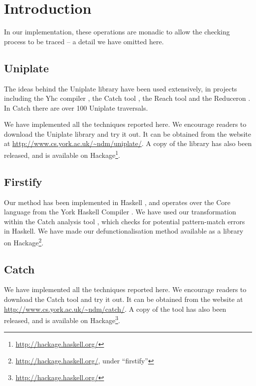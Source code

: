 
\chapter{Introduction}



\cite{haskell}

In our implementation, these operations are monadic to allow the checking process to be traced -- a detail we have omitted here.

\section{Uniplate}

The ideas behind the Uniplate library have been used extensively, in projects including the Yhc compiler \citep{me:yhc_core}, the Catch tool \citep{me:catch_tfp}, the Reach tool \cite{naylor:reach} and the Reduceron \cite{naylor:reduceron}. In Catch there are over 100 Uniplate traversals.

We have implemented all the techniques reported here. We encourage readers to download the Uniplate library and try it out. It can be obtained from the website at \url{http://www.cs.york.ac.uk/~ndm/uniplate/}. A copy of the library has also been released, and is available on Hackage\footnote{\url{http://hackage.haskell.org/}}.

\section{Firstify}

Our method has been implemented in Haskell \cite{haskell}, and operates over the Core language from the York Haskell Compiler \cite{me:yhc_core}. We have used our transformation within the Catch analysis tool \cite{me:catch_icfp}, which checks for potential pattern-match errors in Haskell. We have made our defunctionalisation method available as a library on Hackage\footnote{\url{http://hackage.haskell.org/}, under ``firstify''}.

\section{Catch}


We have implemented all the techniques reported here. We encourage readers to download the Catch tool and try it out. It can be obtained from the website at \url{http://www.cs.york.ac.uk/~ndm/catch/}. A copy of the tool has also been released, and is available on Hackage\footnote{\url{http://hackage.haskell.org/}}.

